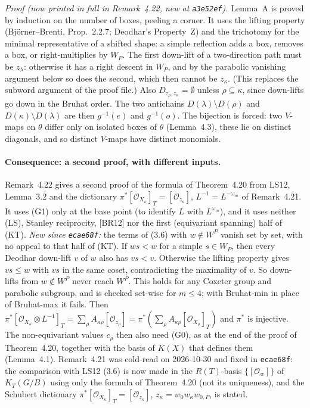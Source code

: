 \documentclass[11pt]{article}
\theoremstyle{plain}
\theoremstyle{remark}
\newcommand{\cO}{\mathcal{O}}
\begin{document}
\emph{Proof (now printed in full in Remark~4.22, new at \texttt{a3e52ef}).} Lemma~A is proved by induction on the number of boxes, peeling a corner. It
uses the lifting property (Bj\"orner--Brenti, Prop.~2.2.7; Deodhar's Property~Z) and the trichotomy for the minimal
representative of a shifted shape: a simple reflection adds a box, removes a box, or right-multiplies
by $W_P$. The first down-lift of a two-direction path must be $z_\lambda$: otherwise it has a right descent in $W_P$, and by
the parabolic vanishing argument below so does the second, which then cannot be $z_\kappa$. (This replaces the subword
argument of the proof file.) Also $D_{z_\rho,z_\kappa}=\emptyset$ unless $\rho\subseteq\kappa$, since down-lifts go down in
the Bruhat order. The two antichains
$D(\lambda)\setminus D(\rho)$ and $D(\kappa)\setminus D(\lambda)$ are then $g^{-1}(e)$ and $g^{-1}(o)$. The bijection is forced:
two $V$-maps on $\theta$ differ only on isolated boxes of $\theta$ (Lemma~4.3), these lie on distinct
diagonals, and so distinct $V$-maps have distinct monomials.

\paragraph{Consequence: a second proof, with different inputs.} Remark~4.22 gives a second proof of
the formula of Theorem~4.20 from LS12, Lemma~3.2 and the dictionary
$\pi^*[\cO_{X_\kappa}]_T=[\cO_{z_\kappa}]$, $L^{-1}=L^{-\omega_m}$ of Remark~4.21. It uses (G1) only
at the base point (to identify $L$ with $L^{\omega_m}$), and it uses neither (LS), Stanley
reciprocity, [BR12] nor the first (equivariant spanning) half of (KT). \emph{New since \texttt{ecae68f}:} the terms of (3.6) with $w\notin W^P$
vanish set by set, with no appeal to that half of (KT). If $ws<w$ for a simple $s\in W_P$, then every Deodhar
down-lift $v$ of $w$ also has $vs<v$. Otherwise the lifting property gives $vs\le w$ with $vs$ in the
same coset, contradicting the maximality of $v$. So down-lifts from $w\notin W^P$ never reach $W^P$.
This holds for any Coxeter group and parabolic subgroup, and is checked set-wise for $m\le4$; with
Bruhat-min in place of Bruhat-max it fails. Then
$\pi^*[\cO_{X_\kappa}\otimes L^{-1}]_T=\sum_\rho A_{\kappa\rho}[\cO_{z_\rho}]=\pi^*(\sum_\rho A_{\kappa\rho}[\cO_{X_\rho}]_T)$
and $\pi^*$ is injective. The non-equivariant values $c_\rho$ then also need (G0), as at the
end of the proof of Theorem~4.20, together with the basis of $K(X)$ that defines them (Lemma~4.1). Remark~4.21 was cold-read on 2026-10-30 and fixed in
\texttt{ecae68f}: the comparison with LS12 (3.6) is now made in the $R(T)$-basis
$\{[\cO_w]\}$ of $K_T(G/B)$ using only the formula of Theorem~4.20 (not its uniqueness), and the
Schubert dictionary $\pi^*[\cO_{X_\kappa}]_T=[\cO_{z_\kappa}]$, $z_\kappa=w_0w_\kappa w_{0,P}$, is
stated.
\end{document}
